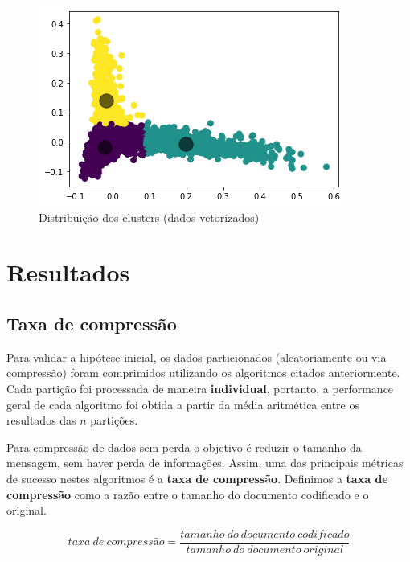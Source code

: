  \begin{figure}[H]
   \centering
   \includegraphics[scale=0.85]{figs/clustercloud.png}
    \caption{Distribuição dos clusters (dados vetorizados)}
    \label{fig:clustercloud}
 \end{figure}

\section{Resultados}
\subsection{Taxa de compressão}
Para validar a hipótese inicial, os dados particionados (aleatoriamente ou via compressão) foram comprimidos utilizando os algoritmos citados anteriormente.
Cada partição foi processada de maneira \textbf{individual}, portanto, a performance geral de cada algoritmo foi obtida a partir da média aritmética entre os resultados das $n$ partições.

Para compressão de dados sem perda o objetivo é reduzir o tamanho da mensagem, sem haver perda de informações.
Assim, uma das principais métricas de sucesso nestes algoritmos é a \textbf{taxa de compressão}.
Definimos a \textbf{taxa de compressão} como a razão entre o tamanho do documento codificado e o original.

\begin{equation}\label{eq:tf}
taxa~de~compressão = \frac{tamanho~do~documento~codificado}{tamanho~do~documento~original}
\end{equation}\label{eq:tf}

